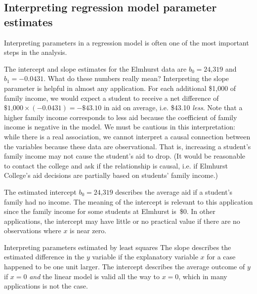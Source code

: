 

\subsection{Interpreting regression model parameter estimates}


\noindent%
Interpreting parameters in a regression model is often one
of the most important steps in the analysis.

\begin{examplewrap}
\begin{nexample}{The intercept and slope estimates for
    the Elmhurst data are $b_0 = \text{24,319}$
    and $b_1 = -0.0431$.
    What do these numbers really mean?}
  Interpreting the slope parameter is helpful in almost any
  application.
  For each additional \$1,000 of family income, we would expect
  a student to receive a net difference of
  $\$\text{1,000}\times (-0.0431) = -\$43.10$ in aid on average,
  i.e. \$43.10 \emph{less}.
  Note that a higher family income corresponds to less aid
  because the coefficient of family income is negative in
  the model.
  We must be cautious in this interpretation:
  while there is a real association, we cannot interpret
  a causal connection between the variables because these
  data are observational.
  That is, increasing a student's family income may not
  cause the student's aid to drop.
  (It would be reasonable to contact the college and ask
  if the relationship is causal,
  i.e. if Elmhurst College's aid decisions are partially
  based on students' family income.)

  The estimated intercept $b_0 = \text{24,319}$
  describes the average aid if a student's family had no income.
  The meaning of the intercept is relevant to this application
  since the family income for some students at Elmhurst is~\$0.
  In other applications, the intercept may have little
  or no practical value if there are no observations where
  $x$ is near zero.
\end{nexample}
\end{examplewrap}

\begin{onebox}{Interpreting parameters estimated by least squares}
  The slope describes the estimated difference in the
  $y$ variable if the explanatory variable $x$ for a case
  happened to be one unit larger.
  The intercept describes the average outcome of $y$ if $x=0$
  \emph{and} the linear model is valid all the way to $x=0$,
  which in many applications is not the case.
\end{onebox}

